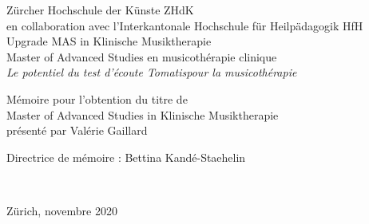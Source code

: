 
\begin{titlepage}
 \begin{center}
    {\Large
     Zürcher Hochschule der Künste ZHdK\\
 	en collaboration avec l'Interkantonale Hochschule für
        Heilpädagogik HfH \\
	 Upgrade MAS in Klinische Musiktherapie \\ Master of Advanced Studies en musicothérapie clinique\\}
  \vfill
  {\Huge \emph{Le potentiel du test d'écoute Tomatis\textsuperscript \textregistered  pour la 
  musicothérapie} 
  	\vfill%
} \medskip



{\Large Mémoire pour l'obtention du titre de\\ \medskip
Master of Advanced Studies in Klinische Musiktherapie \\ \smallskip 
présenté par Valérie Gaillard}

{\large Directrice de mémoire : Bettina Kandé-Staehelin}



	 \hfill \\
	 \rule{0mm}{1pt} \hfill
{\large Zürich, novembre  2020}
 \end{center}
\end{titlepage}
